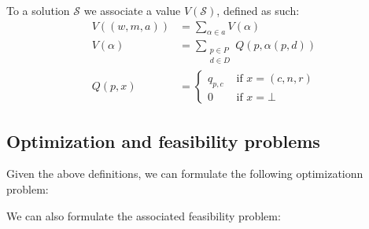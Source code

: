 To a solution $\mathcal{S}$ we associate a value $V(\mathcal{S})$, defined as such:
\begin{align*}
V((w, m, a)) &= \sum_{\alpha \in a} V(\alpha)\\
V(\alpha) &= \sum_{\substack{p \in P \\d \in D}} Q(p, \alpha(p, d))\\
Q(p, x) &= \begin{cases}
q_{p, c} & \text{ if } x = (c, n, r)\\
0 &\text{ if } x = \bot
\end{cases}
\end{align*}

\newpage
\subsection{Optimization and feasibility problems}

Given the above definitions, we can formulate the following optimizationn problem:

We can also formulate the associated feasibility problem:
